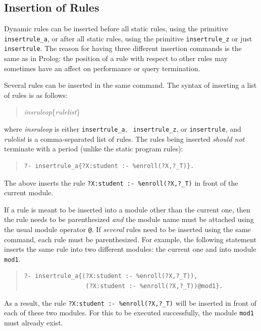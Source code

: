 \documentclass[11pt]{article}
\begin{document}
\subsection{Insertion of Rules}
\label{sec-insertingrule}

Dynamic rules can be inserted before all static rules, using the
primitive {\tt insertrule\_a}, or after all static rules, using the
primitive {\tt insertrule\_z} or just {\tt insertrule}.
The reason for having three different insertion commands is the same as in
Prolog: the position of a rule with respect to other rules
may sometimes have an affect on
performance or query termination.

Several rules
can be inserted in the same command. The syntax of inserting a list of
rules is as follows:
\begin{quote}
\emph{insruleop}\{\emph{rulelist}\}
\end{quote}
\noindent
where \emph{insruleop} is either {\tt insertrule\_a}, {\tt
  insertrule\_z}, or {\tt insertrule},  and \emph{rulelist}  is a comma-separated
  list of rules.  The rules being inserted \emph{should not} terminate
  with a period (unlike the static program rules):
\begin{quote}
\begin{verbatim}
?- insertrule_a{?X:student :- %enroll(?X,?_T)}.
\end{verbatim}
\end{quote}
The above inserts the rule {\tt ?X:student :- \verb|%|enroll(?X,?\_T)} in
front of the current module.

If a rule is meant to be inserted into a module other than the current one,
then the rule needs to be parenthesized \emph{and} the module name must be
attached using the usual module operator {\tt @}. If \emph{several} rules
need to be inserted using the same command, each rule must be
parenthesized.  For example, the following statement inserts the same rule
into two different modules: the current one and into module {\tt mod1}.
\begin{quote}
\begin{verbatim}
?- insertrule_a{(?X:student :- %enroll(?X,?_T)),
                 (?X:student :- %enroll(?X,?_T))@mod1}.
\end{verbatim}
\end{quote}
As a result, the rule {\tt ?X:student :- \verb|%|enroll(?X,?\_T)} will be
inserted in front of each of these two modules.  For this to be executed
successfully, the module {\tt mod1} must already exist.
\end{document}
